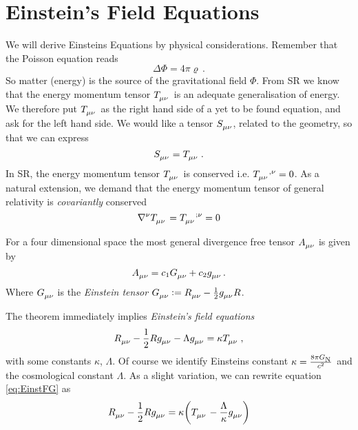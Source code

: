 \chapter{Einstein's Field Equations}
We will derive Einsteins Equations by physical considerations. Remember that the
Poisson equation reads 
\begin{equation}
\Delta\Phi=4\pi\varrho\, .
\end{equation}
So matter (energy) is the source of the gravitational field $\Phi$.  From SR we
know that the energy momentum tensor $\tensor{T}{_\mu_\nu}$ is an adequate
generalisation of energy.
We therefore put $\tensor{T}{_\mu_\nu}$ as the right hand side of a yet to be
found equation, and ask for the left hand side. We would like a tensor
$\tensor{S}{_\mu_\nu}$, related to the geometry, so that we can express
\begin{equation}
\tensor{S}{_\mu_\nu}=\tensor{T}{_\mu_\nu}
\,.
\end{equation}
In SR, the energy momentum tensor $\tensor{T}{_\mu_\nu}$ is conserved i.e.
$\tensor{T}{_\mu_\nu^{,\nu}}=0$. As a natural extension, we demand that the
energy momentum tensor of general relativity is \emph{covariantly} conserved
\begin{equation}
\tensor{\nabla}{^\nu}\tensor{T}{_\mu_\nu}=\tensor{T}{_\mu_\nu^{;\nu}}=0
\end{equation}
\begin{theorem}[Lovelock]
For a four dimensional space
\footnotemark{} the most general divergence free tensor $\tensor{A}{_\mu_\nu}$ is
given by
\begin{equation}
\tensor{A}{_\mu_\nu}= c_1\tensor{G}{_\mu_\nu}+c_2\tensor{g}{_\mu_\nu}\, .
\end{equation}
Where $\tensor{G}{_\mu_\nu}$ is the \emph{Einstein tensor}
$\tensor{G}{_\mu_\nu}:=\tensor{R}{_\mu_\nu}-\frac{1}{2}\tensor{g}{_\mu_\nu}R$.
\end{theorem}
The theorem immediately implies \emph{Einstein's field equations}
\begin{equation}
\tensor{R}{_\mu_\nu}-\frac{1}{2}R\tensor{g}{_\mu_\nu}-\Lambda\tensor{g}{_\mu_\nu}
=\kappa\tensor{T}{_\mu_\nu}\, ,\label{eq:EinstFG}
\end{equation}
with some constants $\kappa$, $\Lambda$.
Of course we identify Einsteins constant $\kappa=\frac{8\pi
G\textsubscript{N}}{c^2}$ and the cosmological constant $\Lambda$. As a slight
variation, we can rewrite equation \eqref{eq:EinstFG} as
\begin{equation}
\tensor{R}{_\mu_\nu}-\frac{1}{2}R\tensor{g}{_\mu_\nu}
=\kappa\left(\tensor{T}{_\mu_\nu}-\frac{\Lambda}{\kappa}\tensor{g}{_\mu_\nu}\right)
\end{equation}
